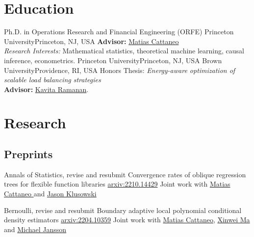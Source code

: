 \documentclass[10pt,a4paper,roman]{moderncv}        %
\begin{document}
\makecvtitle

\vspace{-0.7cm}
\section{Education}
{Ph.D. in Operations Research and Financial Engineering (ORFE)}
{Princeton University}{Princeton, NJ, USA}{}
{\textbf{Advisor: }\color{blue}\href{https://cattaneo.princeton.edu}{Matias Cattaneo}\color{black}\\
\textit{Research Interests:} Mathematical statistics, theoretical machine
learning, causal inference, econometrics.}
{Princeton University}{Princeton, NJ, USA}{}{}
{Brown University}{Providence, RI, USA}{}{ Honors Thesis: \textit{Energy-aware optimization of scalable load balancing
    strategies}
  \\
  \textbf{Advisor: }
  \color{blue}\href{https://www.brown.edu/academics/applied-mathematics/faculty/kavita-ramanan/home}
  {Kavita Ramanan}\color{black}.}  %
{}

\vspace{-0.3cm}
\section{Research}
\subsection{Preprints}
\cventry{}
{Annals of Statistics, revise and resubmit}
{Convergence rates of oblique regression trees for flexible function libraries}
{\color{blue} \href{https://arxiv.org/abs/2210.14429}{arxiv:2210.14429} \color{black}}
{}
{Joint work with
  \color{blue}\href{https://cattaneo.princeton.edu}{Matias Cattaneo }\color{black} and
  \color{blue}\href{https://klusowski.princeton.edu}{Jason Klusowski}}

\cventry{}
{Bernoulli, revise and resubmit}
{Boundary adaptive local polynomial conditional density estimators}
{\color{blue}\href{https://arxiv.org/abs/2204.10359}{arxiv:2204.10359}\color{black}}{}
{Joint work with \color{blue}\href{https://cattaneo.princeton.edu}{Matias Cattaneo}\color{black},
  \color{blue}\href{https://sites.google.com/view/xinweima/home?authuser=0}{Xinwei
    Ma }\color{black}
  and
  \color{blue}\href{https://sites.google.com/berkeley.edu/michael-jansson/}{Michael
    Jansson}\color{black}
}
\end{document}
